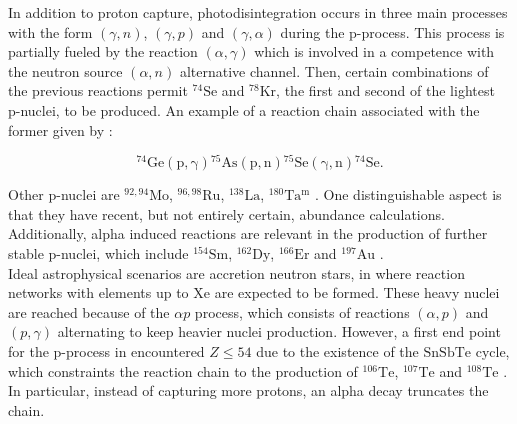 \documentclass[openany]{book}
\begin{document}
In addition to proton capture, photodisintegration occurs in three main processes with the form $(\gamma, n)$, $(\gamma, p)$ and $(\gamma, \alpha)$ during the p-process.  This process is partially fueled by the reaction $(\alpha, \gamma)$ which is involved in a competence with the neutron source $(\alpha, n)$ alternative channel. Then, certain combinations of the previous reactions permit $\mathrm{{}^{74}Se}$ and $\mathrm{{}^{78}Kr}$, the first and second of the lightest p-nuclei, to be produced. An example of a reaction chain associated with the former given by \cite{quinn_spyrou_simon_battaglia_couder_deyoung_dombos_fang_gosrres_kontos_et_2013}: 

\begin{equation}\label{eq:reactions_74Se_pProcess}
	\mathrm{{}^{74}Ge(p, \gamma){}^{75}As(p, n){}^{75}Se(\gamma, n){}^{74}Se}.
\end{equation}

Other p-nuclei are $\mathrm{{}^{92, 94}Mo}$, $\mathrm{{}^{96, 98}Ru}$, $\mathrm{{}^{138}La}$,  $\mathrm{{}^{180}Ta^{m}}$ \cite{delaeter_2008}. One distinguishable aspect is that they have recent, but not entirely certain, abundance calculations.  Additionally, alpha induced reactions are relevant in the production of further stable p-nuclei, which include $\mathrm{{}^{154}Sm}$,  $\mathrm{{}^{162}Dy}$, $\mathrm{{}^{166}Er}$ and $\mathrm{{}^{197}Au}$ \cite{le_duy_hung_2021}. \\

Ideal astrophysical scenarios are accretion neutron stars, in where reaction networks with elements up to $\mathrm{Xe}$ are expected to be formed. These heavy nuclei are reached because of the $\alpha p$ process, which consists of reactions $(\alpha, p)$ and $(p, \gamma)$ alternating to keep  heavier nuclei production. However, a first end point for the p-process in encountered $Z \le 54$ due to the existence of the $\mathrm{SnSbTe}$ cycle, which constraints the reaction chain to the production of $\mathrm{{}^{106}Te}$, $\mathrm{{}^{107}Te}$ and $\mathrm{{}^{108}Te}$ \cite{schatz_aprahamian_barnard_bildsten_cumming_ouellette_rauscher_thielemann_wiescher_2001}. In particular, instead of capturing more protons, an alpha decay truncates the chain. \\
\end{document}
